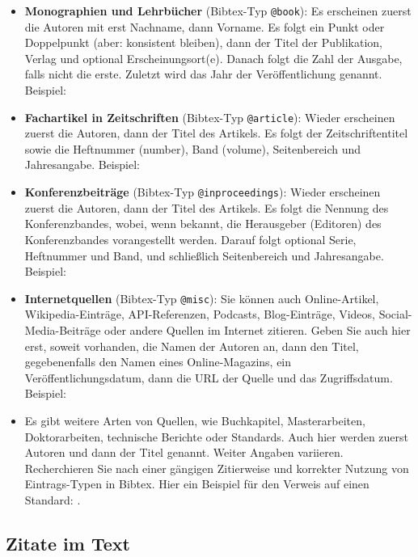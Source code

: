 \begin{itemize}
    
    \item \textbf{Monographien und Lehrbücher} (Bibtex-Typ \texttt{@book}): 
    Es erscheinen zuerst die Autoren mit erst Nachname, dann Vorname. Es folgt ein Punkt oder Doppelpunkt (aber: konsistent bleiben), dann der Titel der Publikation, Verlag und optional Erscheinungsort(e). Danach folgt die Zahl der Ausgabe, falls nicht die erste. Zuletzt wird das Jahr der Veröffentlichung genannt. Beispiel: \cite{Sutton2018}
    
    \item \textbf{Fachartikel in Zeitschriften} (Bibtex-Typ \texttt{@article}): 
    Wieder erscheinen zuerst die Autoren, dann der Titel des Artikels. Es folgt der Zeitschriftentitel sowie die Heftnummer (number),  Band (volume), Seitenbereich und Jahresangabe. Beispiel: \cite{Greenyer2013}
    
    \item \textbf{Konferenzbeiträge} (Bibtex-Typ \texttt{@inproceedings}): 
    Wieder erscheinen zuerst die Autoren, dann der Titel des Artikels. Es folgt die Nennung des Konferenzbandes, wobei, wenn bekannt, die Herausgeber (Editoren) des Konferenzbandes vorangestellt werden.
    Darauf folgt optional Serie, Heftnummer und Band, und schließlich Seitenbereich und Jahresangabe. Beispiel: \cite{Greenyer2007}
    
    \item \textbf{Internetquellen} (Bibtex-Typ \texttt{@misc}): Sie können auch Online-Artikel, Wikipedia-Einträge, API-Referenzen, Podcasts, Blog-Einträge, Videos, Social-Media-Beiträge oder andere Quellen im Internet zitieren.
    Geben Sie auch hier erst, soweit vorhanden, die Namen der Autoren an, dann den Titel, gegebenenfalls den Namen eines Online-Magazins, ein Veröffentlichungsdatum, dann die URL der Quelle und das Zugriffsdatum. Beispiel: \cite{Gebhard2021}
    
    \item Es gibt weitere Arten von Quellen, wie Buchkapitel, Masterarbeiten, Doktorarbeiten, technische Berichte oder Standards. Auch hier werden zuerst Autoren und dann der Titel genannt. Weiter Angaben variieren. Recherchieren Sie nach einer gängigen Zitierweise und korrekter Nutzung von Eintrags-Typen in Bibtex. Hier ein Beispiel für den Verweis auf einen Standard: \cite{UML251}.
\end{itemize}


\subsection{Zitate im Text}

